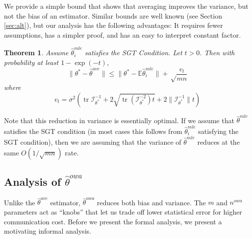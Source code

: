 \documentclass[twoside]{article}
\newtheorem{theorem}{Theorem}
\DeclareMathOperator*{\tr}{tr}
\newcommand{\zero}{\text{\textbf{0}}}
\newcommand{\nowa}{n^{\textit{owa}}}
\newcommand{\E}{\mathbb{E}}
\newcommand{\w}{\theta}
\newcommand{\wowa}{\hat\w^{owa}}
\newcommand{\wave}{\hat\w^{ave}}
\newcommand{\wmle}{\hat\w^{mle}}
\newcommand{\wstar}{{\w^{*}}}
\newcommand{\I}{\mathcal I}
\newcommand{\normal}[2]{\ensuremath{\mathcal{N}\left({{#1}},{{#2}}\right)}}
\newcommand{\ltwo}[1]{{\lVert {#1} \rVert}}
\begin{document}
We provide a simple bound that shows that averaging improves the variance,
but not the bias of an estimator.
Similar bounds are well known (see Section \ref{sec:alt}),
but our analysis has the following advantages:
It requires fewer assumptions, has a simpler proof, and has an easy to interpret constant factor.

\begin{theorem}
\label{thm:wave}
Assume $\wmle_i$ satisfies the SGT Condition.
Let $t>0$.
Then with probability at least $1-\exp(-t)$,
\begin{equation}
\ltwo{\wstar-\wave} \le \ltwo{\wstar-\E\wmle_i} + \sqrt\frac{v_t}{mn}
\end{equation}
where
\begin{equation}
v_t =
\sigma^2
\left(
\tr{\I^{-1}_{\wstar}}
+ 2\sqrt{\tr \left({\I^{-2}_{\wstar}}\right)t}
+ 2\ltwo{\I^{-1}_{\wstar}}t
\right)
\label{eq:vt}
\end{equation}
\end{theorem}


Note that this reduction in variance is essentially optimal.
If we assume that $\wmle$ satisfies the SGT condition
(in most cases this follows from $\wmle_i$ satisfying the SGT condition),
then we are assuming that the variance of $\wmle$ reduces at the same $O(1/\sqrt{mn})$ rate.

\subsection {Analysis of $\wowa$}

Unlike the $\wave$ estimator,
$\wowa$ reduces both bias and variance.
The $m$ and $\nowa$ parameters act as ``knobs'' that let us trade off lower statistical error for higher communication cost.
Before we present the formal analysis,
we present a motivating informal analysis.
\end{document}

